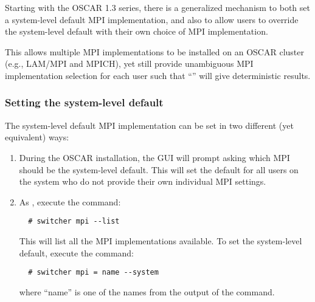 %
%
%
%

Starting with the OSCAR 1.3 series, there is a generalized mechanism
to both set a system-level default MPI implementation, and also to
allow users to override the system-level default with their own choice
of MPI implementation.

This allows multiple MPI implementations to be installed on an OSCAR
cluster (e.g., LAM/MPI and MPICH), yet still provide unambiguous MPI
implementation selection for each user such that ``'' will give deterministic results.


\subsubsection{Setting the system-level default}

The system-level default MPI implementation can be set in two
different (yet equivalent) ways:

\begin{enumerate}
\item During the OSCAR installation, the GUI will prompt asking which
  MPI should be the system-level default.  This will set the default
  for all users on the system who do not provide their own individual
  MPI settings.
  
\item As , execute the command:

\begin{verbatim}
  # switcher mpi --list
\end{verbatim}

   This will list all the MPI implementations available.  To set the
   system-level default, execute the command:

\begin{verbatim}
  # switcher mpi = name --system
\end{verbatim}
   
   where ``name'' is one of the names from the output of the
    command.
\end{enumerate}

